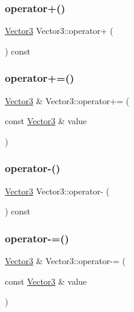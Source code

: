\subsubsection{\texorpdfstring{operator+()}{operator+()}}
{\footnotesize\ttfamily \mbox{\hyperlink{struct_math_1_1_vector3}{Vector3}} Vector3\+::operator+ (\begin{DoxyParamCaption}{ }\end{DoxyParamCaption}) const}

\mbox{\label{struct_math_1_1_vector3_a0bfa1db9b0bb237c8120b5e98be1187e}} 
\subsubsection{\texorpdfstring{operator+=()}{operator+=()}}
{\footnotesize\ttfamily \mbox{\hyperlink{struct_math_1_1_vector3}{Vector3}} \& Vector3\+::operator+= (\begin{DoxyParamCaption}\item[{const \mbox{\hyperlink{struct_math_1_1_vector3}{Vector3}} \&}]{value }\end{DoxyParamCaption})}

\mbox{\label{struct_math_1_1_vector3_abf941de6e1724901c46d5e9e1448358f}} 
\subsubsection{\texorpdfstring{operator-\/()}{operator-()}}
{\footnotesize\ttfamily \mbox{\hyperlink{struct_math_1_1_vector3}{Vector3}} Vector3\+::operator-\/ (\begin{DoxyParamCaption}{ }\end{DoxyParamCaption}) const}

\mbox{\label{struct_math_1_1_vector3_a9208e1fb073abed8764025d47c0a5493}} 
\subsubsection{\texorpdfstring{operator-\/=()}{operator-=()}}
{\footnotesize\ttfamily \mbox{\hyperlink{struct_math_1_1_vector3}{Vector3}} \& Vector3\+::operator-\/= (\begin{DoxyParamCaption}\item[{const \mbox{\hyperlink{struct_math_1_1_vector3}{Vector3}} \&}]{value }\end{DoxyParamCaption})}

